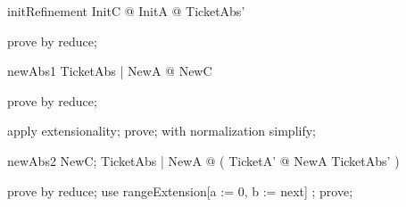 \documentclass{article}
\begin{document}
\begin{theorem}{initRefinement}
  \forall InitC @ \exists InitA @ TicketAbs'
\end{theorem}
\begin{zproof}
prove by reduce;
\end{zproof}


\begin{theorem}{newAbs1}
  \forall TicketAbs | \pre NewA @ \pre NewC
\end{theorem}
\begin{zproof}
prove by reduce;
\end{zproof}

\begin{zproof}
apply extensionality;
prove;
with normalization simplify;
\end{zproof}

\begin{theorem}{newAbs2}
  \forall NewC; TicketAbs | \pre NewA @
  ( \exists TicketA' @ NewA \land TicketAbs' )
\end{theorem}
\begin{zproof}
prove by reduce;
use rangeExtension[a := 0, b := next] ;
prove;
\end{zproof}
\end{document}
